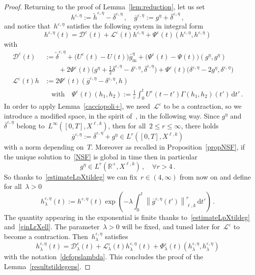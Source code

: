 \documentclass[11pt]{article}
\theoremstyle{definition}
\numberwithin{equation}{section}
\numberwithin{figure}{section}
\numberwithin{table}{section}
\newcommand*{\dd}{\mathrm{d}}
\newcommand*{\dt}{\dd t}
\newcommand*\R {\mathbb{R}}
\newcommand*\eps{{\varepsilon}}
\newcommand*\e{{\varepsilon}}
\DeclareMathOperator{\inn}{in}
\let\oldforall\forall
\renewcommand*{\forall}{\mathrel{\oldforall}}
\begin{document}
\begin{proof}
Returning to the proof of Lemma~\ref{lem:reduction}, let us set
\[
h^{\e,\eta} := \widetilde h^{\e,\eta} - \overline\delta^{\eps,\eta} \,, \quad \overline g^{\eps,\eta}:= g^{ \eta} +\overline \delta^{\eps,\eta}\,,
\]
and notice that~$ h^{\e,\eta}$ satisfies the following system in integral form
\begin{equation}\label{integralformheps}
h^{\e,\eta}(t) = \mathcal{D}^{\e}(t) + \mathcal{L}^{\e}(t) h^{\e,\eta}+ \Psi^\e(t) (h^{\e,\eta}, h^{\e,\eta})
\end{equation}
with
\[
\begin{aligned}
\mathcal{D}^\e (t) & := \widetilde \delta^{\eps,\eta} + \big(U^\eps (t) - U (t)\big)\bar g^\eta_{\inn} + \big(\Psi^\eps (t) - \Psi(t) \big) (g^\eta,g^\eta)
\\
& \qquad + 2 \Psi^\eps (t) \Big({g^\eta+\frac 12 \overline\delta^{\eps,\eta}}- \delta^{\eps,\eta}, \overline\delta^{\eps,\eta}\Big) +\Psi^\eps (t)
\big(\delta^{\eps,\eta} -2g^\eta, \delta^{\eps,\eta} \big) \\
\mathcal{L}^\e (t) h& := 2\Psi ^{\e}(t) (\overline g^{\eps,\eta}- \delta^{\eps,\eta},h) \\
&\quad\text{with} \quad
\Psi ^{\e }(t) (h_1,h_2) :=\frac1\e
\int_0^t U^\eps(t-t')\Gamma (h_1,h_2) (t')\, \dt' \,.
\end{aligned}
\]
In order to apply Lemma~\ref{cacciopoli+}, we need~$\mathcal{L}^{\eps}$ to be a contraction, so we introduce a modified space, in the spirit of~\cite{cg}, in the following way. Since $ g^\eta$ and~$\overline\delta^{\eps,\eta}$ belong to~$L^\infty([0,T],X^{\ell,k})$, then for all~$2\leq r \leq\infty$, there holds
\begin{equation}\label{ginLrXellT}
\overline g^{\eps,\eta}:= \overline\delta^{\eps,\eta} +g^\eta\in L^r([0,T],X^{\ell,k})
\end{equation}
with a norm depending on~$T$. Moreover as recalled in Proposition~\ref{propNSF}, if the unique solution to~\eqref{NSF} is global in time then in particular
\begin{equation}\label{ginLrXell}
g^\eta \in L^r(\R^+,X^{\ell,k}) \,, \quad \forall r>4\,.
\end{equation}
So thanks to~\eqref{estimateLpXtildeg} we can fix~$r \in (4,\infty)$ from now on and define for all~$\lambda> 0$
\[
h^{\e,\eta}_\lambda (t):=h^{\e,\eta}(t) \exp \left(-\lambda \int_0^t \left\|\overline g^{\eps,\eta}(t')\right\|_{\ell,k}^r\, \dt'
\right)\,.
\]
The quantity appearing in the exponential is finite thanks to~\eqref{estimateLpXtildeg} and~\eqref{ginLrXell}. The parameter~$\lambda>0$ will be fixed, and tuned later for~$ \mathcal{L}^{\e}$ to become a contraction. Then~$h^{\e,\eta}_\lambda$ satisfies
\[
h^{\e,\eta}_\lambda(t) = \mathcal{D}_\lambda^{\e}(t) + \mathcal{L}_\lambda^{\e}(t) h^{\e,\eta}_\lambda(t) + \Phi^{\e}_\lambda(t) (h^{\e,\eta}_\lambda,h^{\e,\eta}_\lambda)
\]
with the notation~\eqref{defopslambda}. This concludes the proof of the Lemma~\ref{resultstildegeps}.
\end{proof}
\end{document}

